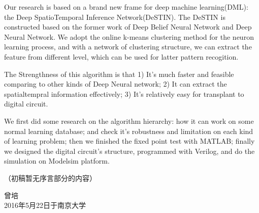 \documentclass[winfonts]{njuthesis}
\begin{document}
\begin{englishabstract}
Our research is based on a brand new frame for deep machine learning(DML): the Deep SpatioTemporal Inference Network(DeSTIN). The DeSTIN is constructed based on the former work of Deep Belief Neural Network and Deep Neural Network. We adopt the online k-means clustering method for the neuron learning process, and with a network of clustering structure, we can extract the feature from different level, which can be used for latter pattern recogition.

The Strengthness of this algorithm is that 1) It's much faster and feasible comparing to other kinds of Deep Neural network; 2) It can extract the spatialtempral information effectively; 3) It's relatively easy for transplant to digital circuit.

We first did some research on the algorithm hierarchy: how it can work on some normal learning database; and check it's robustness and limitation on each kind of learning problem; then we finished the fixed point test with MATLAB; finally we designed the digital circuit's structure, programmed with Verilog, and do the simulation on Modelsim platform.

\end{englishabstract}

%
\begin{preface}
（初稿暂无序言部分的内容）


\vspace{1cm}
\begin{flushright}
曾培\\
2016年5月22日于南京大学
\end{flushright}

\end{preface}

\tableofcontents

\listoffigures

\listoftables
\end{document}
